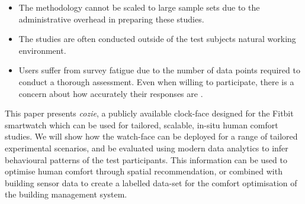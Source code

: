 


\begin{itemize}
  \item The methodology cannot be scaled to large sample sets due to the administrative overhead in preparing these studies.
  \item The studies are often conducted outside of the test subjects natural working environment.
  \item Users suffer from survey fatigue \cite{porter2004multiple} due to the number of data points required to conduct a thorough assessment. Even when willing to participate, there is a concern about how accurately their responses are \cite{Clear2018}.
\end{itemize}

This paper presents \emph{cozie}, a publicly available clock-face designed for the Fitbit smartwatch which can be used for tailored, scalable, in-situ human comfort studies. We will show how the watch-face can be deployed for a range of tailored experimental scenarios, and be evaluated using modern data analytics to infer behavioural patterns of the test participants. This information can be used to optimise human comfort through spatial recommendation, or combined with building sensor data to create a labelled data-set for the comfort optimisation of the building management system. \\










